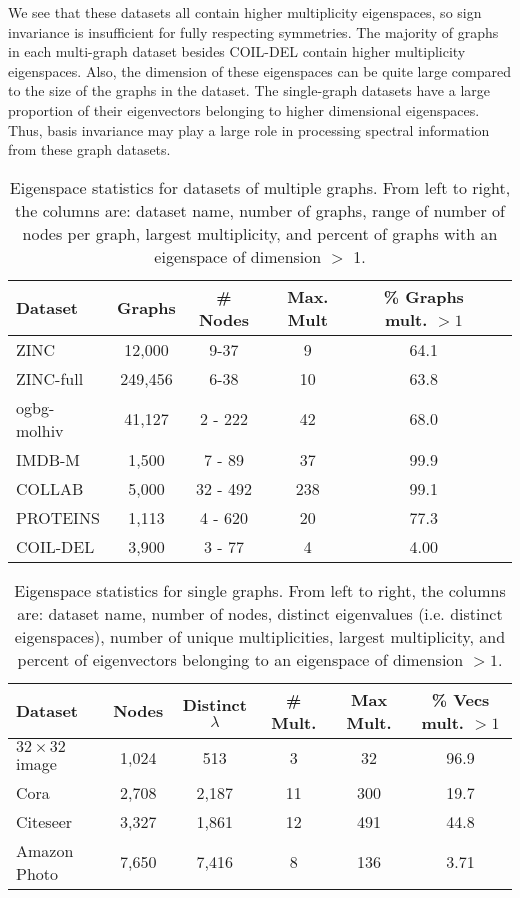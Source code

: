 \documentclass{article} \usepackage{iclr2023_conference,times}
\begin{document}
We see that these datasets all contain higher multiplicity eigenspaces, so sign invariance is insufficient for fully respecting symmetries. The majority of graphs in each multi-graph dataset besides COIL-DEL contain higher multiplicity eigenspaces. Also, the dimension of these eigenspaces can be quite large compared to the size of the graphs in the dataset. The single-graph datasets have a large proportion of their eigenvectors belonging to higher dimensional eigenspaces. Thus, basis invariance may play a large role in processing spectral information from these graph datasets.


\begin{table}
    \centering
    \caption{Eigenspace statistics for datasets of multiple graphs. From left to right, the columns are: dataset name, number of graphs, range of number of nodes per graph, largest multiplicity, and percent of graphs with an eigenspace of dimension $>$ 1.}
    \label{tab:stats_multigraph}
    \begin{tabular}{lccccc}
        \toprule
        Dataset & Graphs & \# Nodes & Max. Mult & \% Graphs mult. $>1$\\
        \midrule
        ZINC & 12,000 & 9-37 & 9 & 64.1 \\
        ZINC-full & 249,456 & 6-38 & 10 & 63.8 \\
        ogbg-molhiv & 41,127 & 2 - 222 & 42 & 68.0  \\
        IMDB-M & 1,500 & 7 - 89 & 37 & 99.9 \\
        COLLAB & 5,000 & 32 - 492 & 238 & 99.1 \\
        PROTEINS & 1,113 & 4 - 620 & 20 & 77.3 \\
        COIL-DEL & 3,900 & 3 - 77 & 4 & 4.00 \\
        \bottomrule
    \end{tabular}
\end{table}

\begin{table}
    \centering
    \caption{Eigenspace statistics for single graphs. From left to right, the columns are: dataset name, number of nodes, distinct eigenvalues (i.e. distinct eigenspaces),  number of unique multiplicities, largest multiplicity, and percent of eigenvectors belonging to an eigenspace of dimension $> 1$.}
    \label{tab:stats_onegraph}
    \begin{tabular}{lccccc}
        \toprule
        Dataset & Nodes & Distinct $\lambda$ & \# Mult. & Max Mult. & \% Vecs mult. $>1$  \\
        \midrule
        $32 \times 32$ image  & 1,024 & 513 & 3 & 32  & 96.9 \\
        Cora & 2,708 & 2,187 & 11 & 300 & 19.7 \\
        Citeseer & 3,327 & 1,861 & 12 & 491 &  44.8 \\
        Amazon Photo & 7,650 & 7,416 & 8 & 136 & 3.71 \\
        \bottomrule
    \end{tabular}
\end{table}
\end{document}
